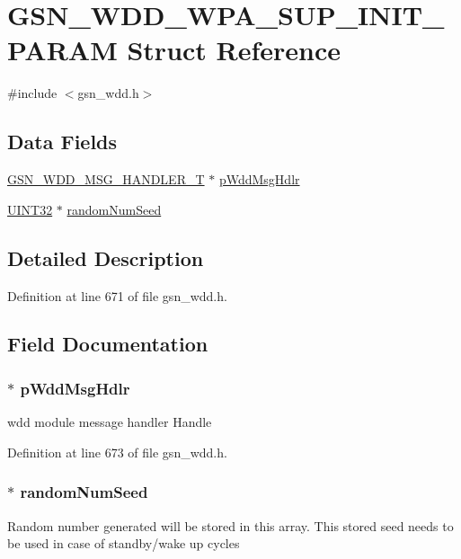 \hypertarget{a00304}{
\section{GSN\_\-WDD\_\-WPA\_\-SUP\_\-INIT\_\-PARAM Struct Reference}
\label{a00304}
}


{\ttfamily \#include $<$gsn\_\-wdd.h$>$}

\subsection*{Data Fields}
\begin{DoxyCompactItemize}
\item 
\hyperlink{a00279}{GSN\_\-WDD\_\-MSG\_\-HANDLER\_\-T} $\ast$ \hyperlink{a00304_a6978c51a66d7b07a4fa1a13f9af82548}{pWddMsgHdlr}
\item 
\hyperlink{a00660_gae1e6edbbc26d6fbc71a90190d0266018}{UINT32} $\ast$ \hyperlink{a00304_a665a93f82642e7a92525e134f847ed89}{randomNumSeed}
\end{DoxyCompactItemize}


\subsection{Detailed Description}


Definition at line 671 of file gsn\_\-wdd.h.



\subsection{Field Documentation}
\hypertarget{a00304_a6978c51a66d7b07a4fa1a13f9af82548}{
\subsubsection[{pWddMsgHdlr}]{$\ast$ {\bf pWddMsgHdlr}}}
\label{a00304_a6978c51a66d7b07a4fa1a13f9af82548}
wdd module message handler Handle 

Definition at line 673 of file gsn\_\-wdd.h.

\hypertarget{a00304_a665a93f82642e7a92525e134f847ed89}{
\subsubsection[{randomNumSeed}]{$\ast$ {\bf randomNumSeed}}}
\label{a00304_a665a93f82642e7a92525e134f847ed89}
Random number generated will be stored in this array. This stored seed needs to be used in case of standby/wake up cycles 

